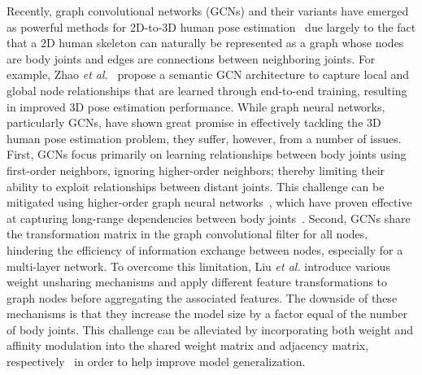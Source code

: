 \documentclass[10pt,journal]{IEEEtran}
\begin{document}
Recently, graph convolutional networks (GCNs) and their variants have emerged as powerful methods for 2D-to-3D human pose estimation~\cite{zhao2019semantic,zou2020high,quan2021higher,liu2020comprehensive,zou2021modulated,Guoliang:22} due largely to the fact that a 2D human skeleton can naturally be represented as a graph whose nodes are body joints and edges are connections between neighboring joints. For example, Zhao \textit{et al.}~\cite{zhao2019semantic} propose a semantic GCN architecture to capture local and global node relationships that are learned through end-to-end training, resulting in improved 3D pose estimation performance. While graph neural networks, particularly GCNs, have shown great promise in effectively tackling the 3D human pose estimation problem, they suffer, however, from a number of issues. First, GCNs focus primarily on learning relationships between body joints using first-order neighbors, ignoring higher-order neighbors; thereby limiting their ability to exploit relationships between distant joints. This challenge can be mitigated using higher-order graph neural networks~\cite{abu2019mixhop}, which have proven effective at capturing long-range dependencies between body joints~\cite{zou2020high,quan2021higher}. Second, GCNs share the transformation matrix in the graph convolutional filter for all nodes, hindering the efficiency of information exchange between nodes, especially for a multi-layer network. To overcome this limitation, Liu \emph{et al.} \cite{liu2020comprehensive} introduce various weight unsharing mechanisms and apply different feature transformations to graph nodes before aggregating the associated features. The downside of these mechanisms is that they increase the model size by a factor equal of the number of body joints. This challenge can be alleviated by incorporating both weight and affinity modulation into the shared weight matrix and adjacency matrix, respectively~\cite{zou2021modulated} in order to help improve model generalization.
\end{document}
